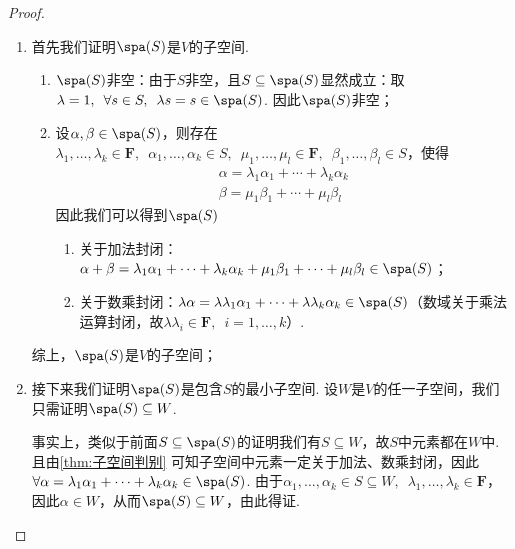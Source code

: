 \begin{proof}
    \begin{enumerate}
        \item 首先我们证明$\spa(S)$是$V$的子空间.
              \begin{enumerate}
                  \item $\spa(S)$非空：由于$S$非空，且$S\subseteq\spa(S)$显然成立：取$\lambda=1,\enspace\forall s\in S,\enspace \lambda s=s\in\spa(S)$. 因此$\spa(S)$非空；

                  \item 设$\alpha,\beta\in\spa(S)$，则存在$\lambda_1,\ldots,\lambda_k\in\mathbf{F},\enspace \alpha_1,\ldots,\alpha_k\in S,\enspace\mu_1,\ldots,\mu_l\in\mathbf{F},\enspace\beta_1,\ldots,\beta_l\in S$，使得
                        \begin{gather*}
                            \alpha=\lambda_1\alpha_1+\cdots+\lambda_k\alpha_k \\
                            \beta=\mu_1\beta_1+\cdots+\mu_l\beta_l
                        \end{gather*}
                        因此我们可以得到$\spa(S)$
                        \begin{enumerate}
                            \item 关于加法封闭：$\alpha+\beta=\lambda_1\alpha_1+\cdots+\lambda_k\alpha_k+\mu_1\beta_1+\cdots+\mu_l\beta_l\in\spa(S)$；

                            \item 关于数乘封闭：$\lambda\alpha=\lambda\lambda_1\alpha_1+\cdots+\lambda\lambda_k\alpha_k\in\spa(S)$（数域关于乘法运算封闭，故$\lambda\lambda_i\in\mathbf{F},\enspace i=1,\ldots,k$）.
                        \end{enumerate}
              \end{enumerate}
              综上，$\spa(S)$是$V$的子空间；

        \item 接下来我们证明$\spa(S)$是包含$S$的最小子空间. 设$W$是$V$的任一子空间，我们只需证明$\spa(S)\subseteq W$.

              事实上，类似于前面$S\subseteq\spa(S)$的证明我们有$S\subseteq W$，故$S$中元素都在$W$中. 且由\autoref{thm:子空间判别} 可知子空间中元素一定关于加法、数乘封闭，因此$\forall {\alpha}=\lambda_1\alpha_1+\cdots+\lambda_k\alpha_k\in\spa(S)$. 由于$\alpha_1,\ldots,\alpha_k\in S\subseteq W,\enspace\lambda_1,\ldots,\lambda_k\in\mathbf{F}$，因此$\alpha\in W$，从而$\spa(S)\subseteq W$，由此得证.
    \end{enumerate}
\end{proof}

